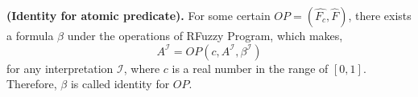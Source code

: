 \begin{defin} \textbf{(Identity for atomic predicate).}
\label{def:IdentityAtomic}
For some certain $OP=(\hat{F_c},\hat{F})$, there exists a formula $\beta$ under the operations of RFuzzy Program, which makes,
\[A^{\mathcal{I}} = OP(c,A^{\mathcal{I}},\beta^{\mathcal{I}})\]
for any interpretation $\mathcal{I}$, where $c$ is a real number in the range of $[0,1]$. Therefore, $\beta$ is called identity for $OP$.
\end{defin}

\begin{comment}
We are going to show the existence of identity for any $OP=(\hat{F_c},\hat{F})$ here. In mathematical logic, there are several formal systems of \textit{Fuzzy Logic}, and most of them belong to so-called \textit{t-norm fuzzy logics} \cite{HP98}.
A t-norm abbreviated of \textit{triangular norm} is a binary algebraic operation on the interval [0, 1], which is use to generalize conjunction in t-norm fuzzy logic. A t-norm \cite{KPMRPE00} is defined as a function $\top: [0, 1]\times[0, 1]\rightarrow[0, 1]$, which satisfies the following properties:
\begin{itemize}
\item Commutativity: $\top(a, b) = \top(b, a)$
\item Monotonicity: $\top(a, b) \leq \top(c, d)$ if $a \leq c$ and $b \leq d$
\item Associativity: $\top(a, \top(b, c)) = \top(\top(a, b), c)$
\item Identity element: $\top(a, 1) = a$
\end{itemize}

T-conorm (S-norm) is dual to t-norm under the order-reversing operation which assigns 1-x to x on [0, 1]. Given a t-norm, the complementary t-conorm is defined by
\[\bot(a,b) = 1- \top(1-a,1-b)\]
A t-conorm is used to represent logical disjunction in t-norm fuzzy logic. It satisfies the following conditions, which can be used for an equivalent axiomatic definition of t-conorm independently of t-norm:
\begin{itemize}
\item Commutativity: $\bot(a, b) = \bot(b, a)$
\item Monotonicity: $\bot(a, b) \leq \bot(c, d)$ if $a \leq c$ and $b \leq d$
\item Associativity: $\bot(a, \bot(b, c)) = \bot(\bot(a, b), c)$
\item Identity element: $\bot(a, 0) = a$
\end{itemize}


\end{comment}
